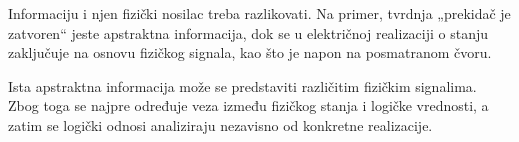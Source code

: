 
Informaciju i njen fizički nosilac treba razlikovati. Na primer, tvrdnja „prekidač je zatvoren“ jeste apstraktna informacija, dok se u električnoj realizaciji o stanju zaključuje na osnovu fizičkog signala, kao što je napon na posmatranom čvoru.

Ista apstraktna informacija može se predstaviti različitim fizičkim signalima. Zbog toga se najpre određuje veza između fizičkog stanja i logičke vrednosti, a zatim se logički odnosi analiziraju nezavisno od konkretne realizacije.
